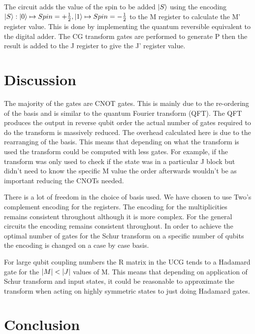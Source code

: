 \documentclass[12pt]{article}
\begin{document}
The circuit adds the value of the spin to be added $\left\vert{S}\right\rangle$ using the encoding $\left\vert{S}\right\rangle : \left\vert{0}\right\rangle \mapsto Spin = +\frac{1}{2}, \left\vert{1}\right\rangle \mapsto Spin = -\frac{1}{2}$ to the M register to calculate the M' register value. This is done by implementing the quantum reversible equivalent to the digital adder. The CG transform gates are performed to generate P then the result is added to the J register to give the J' register value.

\section{Discussion}

The majority of the gates are CNOT gates. This is mainly due to the re-ordering of the basis and is similar to the quantum Fourier transform (QFT). The QFT produces the output in reverse qubit order the actual number of gates required to do the transform is massively reduced. The overhead calculated here is due to the rearranging of the basis. This means that depending on what the transform is used the transform could be computed with less gates. For example, if the transform was only used to check if the state was in a particular J block but didn't need to know the specific M value the order afterwards wouldn't be as important reducing the CNOTs needed.

There is a lot of freedom in the choice of basis used. We have chosen to use Two's complement encoding for the registers. The encoding for the multiplicities remains consistent throughout although it is more complex. For the general circuits the encoding remains consistent throughout. In order to achieve the optimal number of gates for the Schur transform on a specific number of qubits the encoding is changed on a case by case basis. 

For large qubit coupling numbers the R matrix in the UCG tends to a Hadamard gate for the $\abs{M} < \abs{J}$ values of M. This means that depending on application of Schur transform and input states, it could be reasonable to approximate the transform when acting on highly symmetric states to just doing Hadamard gates.

\section{Conclusion}







\newpage

\begin{landscape}

\end{landscape}

\end{document}
